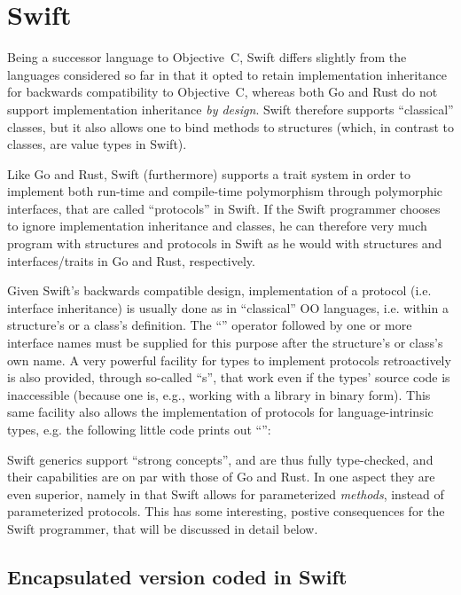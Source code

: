 \documentclass[11pt,oneside]{report}
\newcommand{\code}[1]{{\selectfont\ttfamily{#1}}}
\begin{document}
\section{Swift}

Being a successor language to Objective~C, Swift differs slightly from
the languages considered so far in that it opted to retain
implementation inheritance for backwards compatibility to Objective~C,
whereas both Go and Rust do not support implementation inheritance
\emph{by design}. Swift therefore supports ``classical'' classes, but
it also allows one to bind methods to structures (which, in contrast
to classes, are value types in Swift).

Like Go and Rust, Swift (furthermore) supports a trait system in order
to implement both run-time and compile-time polymorphism through
polymorphic interfaces, that are called ``protocols'' in Swift. If the
Swift programmer chooses to ignore implementation inheritance and
classes, he can therefore very much program with structures and
protocols in Swift as he would with structures and interfaces/traits
in Go and Rust, respectively.

Given Swift's backwards compatible design, implementation of a
protocol (i.e. interface inheritance) is usually done as in
``classical'' OO languages, i.e. within a structure's or a class's
definition. The ``\code{:}'' operator followed by one or more
interface names must be supplied for this purpose after the
structure's or class's own name. A very powerful facility for types to
implement protocols retroactively is also provided, through so-called
``\code{extension}s'', that work even if the types' source code is
inaccessible (because one is, e.g., working with a library in binary
form). This same facility also allows the implementation of protocols
for language-intrinsic types, e.g. the following little code prints
out ``\code{I am 4.9}'':


Swift generics support ``strong concepts'', and are thus fully
type-checked, and their capabilities are on par with those of Go and
Rust. In one aspect they are even superior, namely in that Swift
allows for parameterized \emph{methods}, instead of parameterized
protocols. This has some interesting, postive consequences for the
Swift programmer, that will be discussed in detail below.

\subsection{Encapsulated version coded in Swift}
\end{document}
